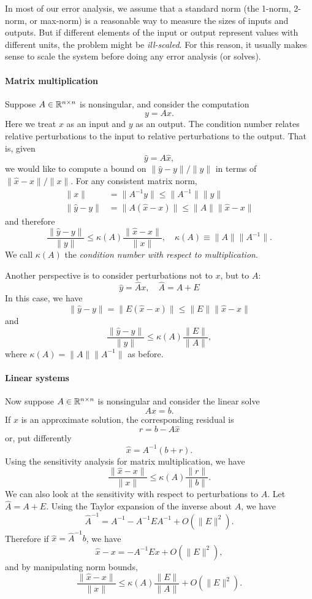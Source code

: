 \documentclass[12pt, leqno]{article}
\begin{document}
In most of our error analysis, we assume that a standard norm
(the 1-norm, 2-norm, or max-norm) is a reasonable way to measure
the sizes of inputs and outputs.  But if different elements of
the input or output represent values with different units, the
problem might be {\em ill-scaled}.  For this reason, it usually
makes sense to scale the system before doing any error analysis
(or solves).

\paragraph{Matrix multiplication}
Suppose $A \in \mathbb{R}^{n \times n}$ is nonsingular, and consider the computation
\[
  y = Ax.
\]
Here we treat $x$ as an input and $y$ as an output.  The condition
number relates relative perturbations to the input to relative
perturbations to the output.  That is, given
\[
  \hat{y} = A \hat{x},
\]
we would like to compute a bound on $\|\hat{y}-y\|/\|y\|$ in terms of
$\|\hat{x}-x\|/\|x\|$.  For any consistent matrix norm,
\begin{align*}
  \|x\| &= \|A^{-1} y\| \leq \|A^{-1}\| \|y\| \\
  \|\hat{y}-y\| & = \|A(\hat{x}-x)\| \leq \|A\| \|\hat{x}-x\| 
\end{align*}
and therefore
\[
  \frac{\|\hat{y}-y\|}{\|y\|} \leq \kappa(A)
  \frac{\|\hat{x}-x\|}{\|x\|}, \quad
  \kappa(A) \equiv \|A\| \|A^{-1}\|.
\]
We call $\kappa(A)$ the {\em condition number with respect to multiplication}.

Another perspective is to consider perturbations not to $x$, but to
$A$:
\[
  \hat{y} = \hat{A} x, \quad \hat{A} = A + E
\]
In this case, we have
\[
  \|\hat{y}-y\| = \|E(\hat{x}-x)\| \leq \|E\| \|\hat{x}-x\| 
\]
and
\[
  \frac{\|\hat{y}-y\|}{\|y\|} \leq
  \kappa(A) \frac{\|E\|}{\|A\|},
\]
where $\kappa(A) = \|A\| \|A^{-1}\|$ as before.

\paragraph{Linear systems}
Now suppose $A \in \mathbb{R}^{n \times n}$ is nonsingular and consider the
linear solve
\[
  Ax = b.
\]
If $\hat{x}$ is an approximate solution, the corresponding residual is
\[
  r = b-A\hat{x}
\]
or, put differently
\[
  \hat{x} = A^{-1} (b + r).
\]
Using the sensitivity analysis for matrix multiplication, we have
\[
  \frac{\|\hat{x}-x\|}{\|x\|} \leq \kappa(A) \frac{\|r\|}{\|b\|}.
\]
We can also look at the sensitivity with respect to perturbations
to $A$.  Let $\hat{A} = A + E$.  Using the Taylor expansion of the
inverse about $A$, we have
\[
  \hat{A}^{-1} = A^{-1} - A^{-1} E A^{-1} + O(\|E\|^2).
\]
Therefore if $\hat{x} = \hat{A}^{-1} b$, we have
\[
  \hat{x}-x = -A^{-1} E x + O(\|E\|^2),
\]
and by manipulating norm bounds,
\[
  \frac{\|\hat{x}-x\|}{\|x\|}
  \leq \kappa(A) \frac{\|E\|}{\|A\|} + O(\|E\|^2).
\]
\end{document}
